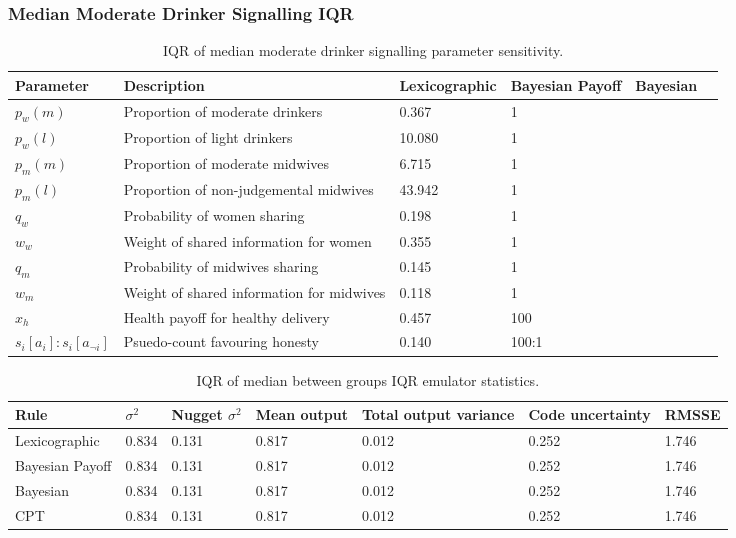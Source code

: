 \subsubsection{Median Moderate Drinker Signalling IQR}

\begin{table}[h!]
\center
\begin{tabular} {|l | l | l | l | l | l |}
\hline
Parameter & Description & Lexicographic & Bayesian Payoff & Bayesian & \ac(CPT) \\ \hline
\(p_{w}(m)\) & Proportion of moderate drinkers & 0.367 & 1 \\ \hline
\(p_{w}(l)\) & Proportion of light drinkers & 10.080 & 1 \\ \hline
\(p_{m}(m)\) & Proportion of moderate midwives & 6.715 & 1 \\ \hline
\(p_{m}(l)\) & Proportion of non-judgemental midwives & 43.942 & 1 \\ \hline
\(q_{w}\) & Probability of women sharing & 0.198 & 1 \\ \hline
\(w_{w}\) & Weight of shared information for women & 0.355 & 1 \\ \hline
\(q_{m}\) & Probability of midwives sharing & 0.145 & 1 \\ \hline
\(w_{m}\) & Weight of shared information for midwives & 0.118 & 1 \\ \hline
\(x_{h}\) & Health payoff for healthy delivery & 0.457 & 100 \\ \hline
\(s_{i}[a_{i}]:s_{i}[a_{\neg i}]\) & Psuedo-count favouring honesty & 0.140 & 100:1 \\ \hline
\end{tabular}
\caption[Table caption text]{IQR of median moderate drinker signalling parameter sensitivity. \label{tab:sa_results_sig_iqr}}
\end{table}

\begin{table}[h!]
\center
\begin{tabular} {|l | l | l | l | l | l |}
\hline
Rule & \(\sigma^2\) & Nugget \(\sigma^2\) & Mean output & Total output variance & Code uncertainty & RMSSE \\ \hline
Lexicographic & 0.834 & 0.131 &  0.817 & 0.012 & 0.252 & 1.746 \\ \hline
Bayesian Payoff & 0.834 & 0.131 &  0.817 & 0.012 & 0.252 & 1.746 \\ \hline
Bayesian & 0.834 & 0.131 &  0.817 & 0.012 & 0.252 & 1.746 \\ \hline
\ac{CPT} & 0.834 & 0.131 &  0.817 & 0.012 & 0.252 & 1.746 \\ \hline
\end{tabular}
\caption[Table caption text]{IQR of median between groups IQR emulator statistics. \label{tab:sa_emulator_sig_iqr}}
\end{table}

